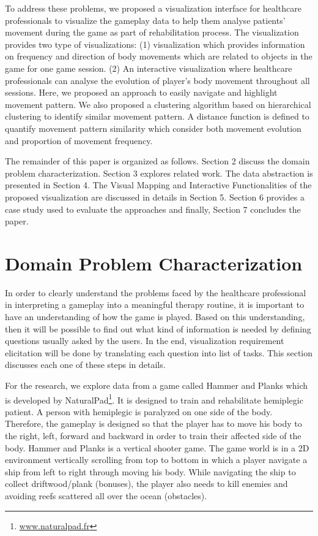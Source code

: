 \documentclass{vgtc}                          %
\begin{document}
To address these problems, we proposed a visualization interface for healthcare professionals to visualize the gameplay data to help them analyse patients' movement during the game as part of rehabilitation process. The visualization provides two type of visualizations: (1) visualization which provides information on frequency and direction of body movements which are related to objects in the game for one game session. (2) An interactive visualization where healthcare professionals can analyse the evolution of player's body movement throughout all sessions. Here, we proposed an approach to easily navigate and highlight movement pattern. We also proposed a clustering algorithm based on hierarchical clustering to identify similar movement pattern. A distance function is defined to quantify movement pattern similarity which consider both movement evolution and proportion of movement frequency.

The remainder of this paper is organized as follows. Section 2 discuss the domain problem characterization. Section 3 explores related work. The data abstraction is presented in Section 4. The Visual Mapping and Interactive Functionalities of the proposed visualization are discussed in details in Section 5. Section 6 provides a case study used to evaluate the approaches and finally, Section 7 concludes the paper.

\section{Domain Problem Characterization}

In order to clearly understand the problems faced by the healthcare professional in interpreting a gameplay into a meaningful therapy routine, it is important to have an understanding of how the game is played. Based on this understanding, then it will be possible to find out what kind of information is needed by defining questions usually asked by the users. In the end, visualization requirement elicitation will be done by translating each question into list of tasks. This section discusses each one of these steps in details.

For the research, we explore data from a game called Hammer and Planks which is developed by NaturalPad\footnote{\url{www.naturalpad.fr}}. It is designed to train and rehabilitate hemiplegic patient. A person with hemiplegic is paralyzed on one side of the body. Therefore, the gameplay is designed so that the player has to move his body to the right, left, forward and backward in order to train their affected side of the body. Hammer and Planks is a vertical shooter game. The game world is in a 2D environment vertically scrolling from top to bottom in which a player navigate a ship from left to right through moving his body. While navigating the ship to collect driftwood/plank (bonuses), the player also needs to kill enemies and avoiding reefs scattered all over the ocean (obstacles).
\end{document}
